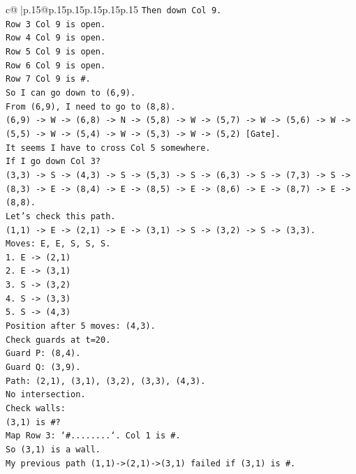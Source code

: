 \documentclass{article}
\begin{document}
{\begin{supertabular}{c@{$\;$}|p{.15\linewidth}@{}p{.15\linewidth}p{.15\linewidth}p{.15\linewidth}p{.15\linewidth}p{.15\linewidth}}
{{{\texttt{Then down Col 9.} \\
\texttt{Row 3 Col 9 is open.} \\
\texttt{Row 4 Col 9 is open.} \\
\texttt{Row 5 Col 9 is open.} \\
\texttt{Row 6 Col 9 is open.} \\
\texttt{Row 7 Col 9 is \#.} \\
\texttt{So I can go down to (6,9).} \\
\texttt{From (6,9), I need to go to (8,8).} \\
\texttt{(6,9) {-}> W {-}> (6,8) {-}> N {-}> (5,8) {-}> W {-}> (5,7) {-}> W {-}> (5,6) {-}> W {-}> (5,5) {-}> W {-}> (5,4) {-}> W {-}> (5,3) {-}> W {-}> (5,2) {[}Gate{]}.} \\
\texttt{It seems I have to cross Col 5 somewhere.} \\
\texttt{If I go down Col 3?} \\
\texttt{(3,3) {-}> S {-}> (4,3) {-}> S {-}> (5,3) {-}> S {-}> (6,3) {-}> S {-}> (7,3) {-}> S {-}> (8,3) {-}> E {-}> (8,4) {-}> E {-}> (8,5) {-}> E {-}> (8,6) {-}> E {-}> (8,7) {-}> E {-}> (8,8).} \\
\texttt{Let's check this path.} \\
\texttt{(1,1) {-}> E {-}> (2,1) {-}> E {-}> (3,1) {-}> S {-}> (3,2) {-}> S {-}> (3,3).} \\
\texttt{Moves: E, E, S, S, S.} \\
\texttt{1. E {-}> (2,1)} \\
\texttt{2. E {-}> (3,1)} \\
\texttt{3. S {-}> (3,2)} \\
\texttt{4. S {-}> (3,3)} \\
\texttt{5. S {-}> (4,3)} \\
\texttt{Position after 5 moves: (4,3).} \\
\texttt{Check guards at t=20.} \\
\texttt{Guard P: (8,4).} \\
\texttt{Guard Q: (3,9).} \\
\texttt{Path: (2,1), (3,1), (3,2), (3,3), (4,3).} \\
\texttt{No intersection.} \\
\texttt{Check walls:} \\
\texttt{(3,1) is \#?} \\
\texttt{Map Row 3: `\#........`. Col 1 is \#.} \\
\texttt{So (3,1) is a wall.} \\
\texttt{My previous path (1,1){-}>(2,1){-}>(3,1) failed if (3,1) is \#.} \\
}}}
\end{supertabular}}
\end{document}
